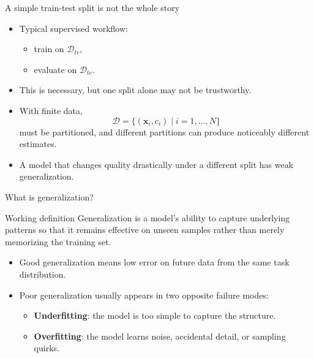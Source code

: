 \documentclass[12pt]{beamer}
\begin{document}
\begin{frame}{A simple train-test split is not the whole story}
  \begin{itemize}
    \item Typical supervised workflow:
      \begin{itemize}
        \item train on $\mathcal{D}_{tr}$,
        \item evaluate on $\mathcal{D}_{te}$.
      \end{itemize}
    \item This is necessary, but one split alone may not be trustworthy.
    \item With finite data,
      \[
        \mathcal{D}=\{(\bm{x}_i,c_i)\mid i=1,\ldots,N\}
      \]
      must be partitioned, and different partitions can produce noticeably different estimates.
    \item A model that changes quality drastically under a different split has weak generalization.
  \end{itemize}
\end{frame}

\begin{frame}{What is generalization?}
  \begin{conceptbox}{Working definition}
    Generalization is a model's ability to capture underlying patterns so that it remains effective
    on unseen samples rather than merely memorizing the training set.
  \end{conceptbox}
  \begin{itemize}
    \item Good generalization means low error on future data from the same task distribution.
    \item Poor generalization usually appears in two opposite failure modes:
      \begin{itemize}
        \item \textbf{Underfitting}: the model is too simple to capture the structure.
        \item \textbf{Overfitting}: the model learns noise, accidental detail, or sampling quirks.
      \end{itemize}
  \end{itemize}
\end{frame}
\end{document}
